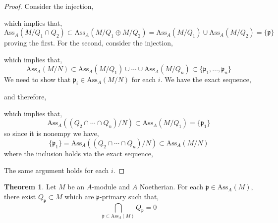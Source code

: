 \documentclass[12pt]{article}
\newcommand{\Ass}[2]{\mathrm{Ass}_{#1}\left( #2 \right)}
\newcommand{\p}{\mathfrak{p}}
\theoremstyle{remark}
\theoremstyle{definition}
\newtheorem{theorem}{Theorem}[section]
\begin{document}
\begin{proof}
Consider the injection,
\begin{center}
\end{center}
which implies that,
\[ \Ass{A}{M / Q_1 \cap Q_2} \subset \Ass{A}{M / Q_1 \oplus M / Q_2} = \Ass{A}{M/Q_1} \cup \Ass{A}{M/Q_2} = \{ \p \} \]
proving the first.
For the second, consider the injection,
\begin{center}
\end{center}
which implies that,
\[ \Ass{A}{M / N} \subset \Ass{A}{M/Q_1} \cup \cdots \cup \Ass{A}{M/Q_n} \subset \{ \p_1, \dots, \p_n \} \]
We need to show that $\p_i \in \Ass{A}{M / N}$ for each $i$.
We have the exact sequence,
\begin{center}
\end{center}
and therefore,
\begin{center}
\end{center}
which implies that,
\[ \Ass{A}{(Q_2 \cap \cdots \cap Q_n) / N} \subset \Ass{A}{M / Q_1} = \{ \p_1 \} \]
so since it is nonempy we have,
\[ \{ \p_1 \} = \Ass{A}{(Q_2 \cap \cdots \cap Q_n) / N} \subset \Ass{A}{M / N} \]
where the inclusion holds via the exact sequence,
\begin{center}
\end{center}
The same argument holds for each $i$. 
\end{proof}

\begin{theorem}
Let $M$ be an $A$-module and $A$ Noetherian. For each $\p \in \Ass{A}{M}$, there exist $Q_{\p} \subset M$ which are $\p$-primary such that,
\[ \bigcap_{\p \subset \Ass{A}{M}} Q_{\p} = 0 \]
\end{theorem}
\end{document}
